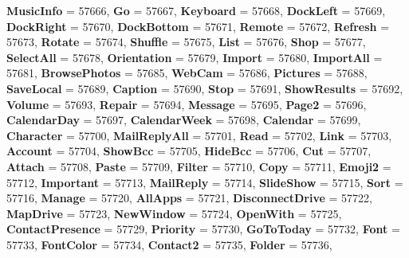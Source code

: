 \begin{DoxyCompactItemize}
\newline
{\bfseries Music\+Info} = 57666, 
{\bfseries Go} = 57667, 
{\bfseries Keyboard} = 57668, 
{\bfseries Dock\+Left} = 57669, 
\newline
{\bfseries Dock\+Right} = 57670, 
{\bfseries Dock\+Bottom} = 57671, 
{\bfseries Remote} = 57672, 
{\bfseries Refresh} = 57673, 
\newline
{\bfseries Rotate} = 57674, 
{\bfseries Shuffle} = 57675, 
{\bfseries List} = 57676, 
{\bfseries Shop} = 57677, 
\newline
{\bfseries Select\+All} = 57678, 
{\bfseries Orientation} = 57679, 
{\bfseries Import} = 57680, 
{\bfseries Import\+All} = 57681, 
\newline
{\bfseries Browse\+Photos} = 57685, 
{\bfseries Web\+Cam} = 57686, 
{\bfseries Pictures} = 57688, 
{\bfseries Save\+Local} = 57689, 
\newline
{\bfseries Caption} = 57690, 
{\bfseries Stop} = 57691, 
{\bfseries Show\+Results} = 57692, 
{\bfseries Volume} = 57693, 
\newline
{\bfseries Repair} = 57694, 
{\bfseries Message} = 57695, 
{\bfseries Page2} = 57696, 
{\bfseries Calendar\+Day} = 57697, 
\newline
{\bfseries Calendar\+Week} = 57698, 
{\bfseries Calendar} = 57699, 
{\bfseries Character} = 57700, 
{\bfseries Mail\+Reply\+All} = 57701, 
\newline
{\bfseries Read} = 57702, 
{\bfseries Link} = 57703, 
{\bfseries Account} = 57704, 
{\bfseries Show\+Bcc} = 57705, 
\newline
{\bfseries Hide\+Bcc} = 57706, 
{\bfseries Cut} = 57707, 
{\bfseries Attach} = 57708, 
{\bfseries Paste} = 57709, 
\newline
{\bfseries Filter} = 57710, 
{\bfseries Copy} = 57711, 
{\bfseries Emoji2} = 57712, 
{\bfseries Important} = 57713, 
\newline
{\bfseries Mail\+Reply} = 57714, 
{\bfseries Slide\+Show} = 57715, 
{\bfseries Sort} = 57716, 
{\bfseries Manage} = 57720, 
\newline
{\bfseries All\+Apps} = 57721, 
{\bfseries Disconnect\+Drive} = 57722, 
{\bfseries Map\+Drive} = 57723, 
{\bfseries New\+Window} = 57724, 
\newline
{\bfseries Open\+With} = 57725, 
{\bfseries Contact\+Presence} = 57729, 
{\bfseries Priority} = 57730, 
{\bfseries Go\+To\+Today} = 57732, 
\newline
{\bfseries Font} = 57733, 
{\bfseries Font\+Color} = 57734, 
{\bfseries Contact2} = 57735, 
{\bfseries Folder} = 57736, 

\end{DoxyCompactItemize}
